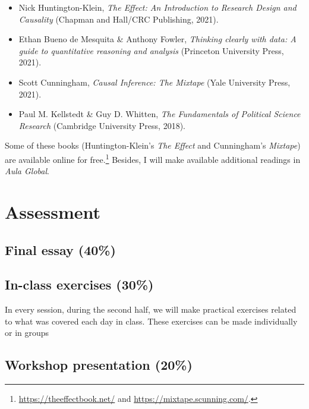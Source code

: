 \documentclass[12pt, a4paper]{article}
\begin{document}
\begin{itemize}
\setlength\itemsep{-5pt}
  \item Nick Huntington-Klein, \textit{The Effect: An Introduction to Research Design and Causality} (Chapman and Hall/CRC Publishing, 2021).
  \item Ethan Bueno de Mesquita \& Anthony Fowler, \textit{Thinking clearly with data: A guide to quantitative reasoning and analysis} (Princeton University Press, 2021).
  \item Scott Cunningham, \textit{Causal Inference: The Mixtape} (Yale University Press, 2021).
  \item Paul M. Kellstedt \& Guy D. Whitten, \textit{The Fundamentals of Political Science Research} (Cambridge University Press, 2018).
\end{itemize}

Some of these books (Huntington-Klein's \textit{The Effect} and Cunningham's \textit{Mixtape}) are available online for free.\footnote{\url{https://theeffectbook.net/} and \url{https://mixtape.scunning.com/}.} Besides, I will make available additional readings in \textit{Aula Global}.

\newpage
\section{Assessment}


\subsection*{Final essay (40\%)}


\subsection*{In-class exercises (30\%)}

In every session, during the second half, we will make practical exercises related to what was covered each day in class. These exercises can be made individually or in groups


\subsection*{Workshop presentation (20\%)}
\end{document}
